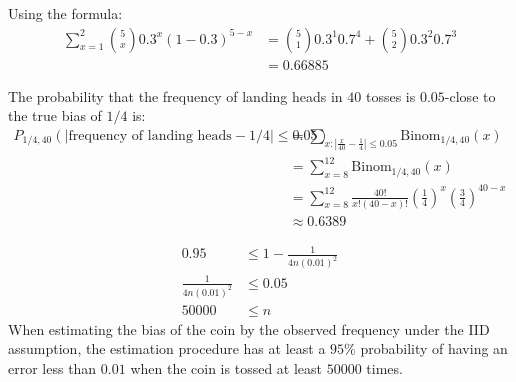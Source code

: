 \documentclass{article}
\begin{document}
Using the formula:
\begin{align*}
    \sum_{x=1}^2 {5 \choose x} 0.3^x {(1 - 0.3)}^{5-x} & = {5 \choose 1} 0.3^1 0.7^4 + {5 \choose 2} 0.3^2 0.7^3 \\
    & = 0.66885
\end{align*}

\clearpage
\problem{}
The probability that the frequency of landing heads in $40$ tosses is $0.05$-close to the true bias of $1/4$ is:
\begin{align*}
    P_{1/4, 40}(|\text{frequency of landing heads} - 1/4| \leq 0.05) & = \sum_{x : \left|\frac{x}{40} - \frac{1}{4}\right| \leq 0.05} \text{Binom}_{1/4, 40}(x) \\
    & = \sum_{x=8}^{12} \text{Binom}_{1/4, 40}(x) \\
    & = \sum_{x=8}^{12} \frac{40!}{x!(40-x)!}\left(\frac{1}{4}\right)^x\left(\frac{3}{4}\right)^{40-x} \\
    & \approx 0.6389
\end{align*}

\clearpage
\problem{}
\begin{align*}
    0.95 & \leq 1 - \frac{1}{4n{(0.01)}^2} \\
    \frac{1}{4n{(0.01)}^2} & \leq 0.05 \\
    50000 & \leq n
\end{align*}
When estimating the bias of the coin by the observed frequency under the IID assumption, the estimation procedure has at least a $95\%$ probability of having an error less than $0.01$ when the coin is tossed at least $50000$ times.
\end{document}
